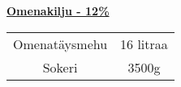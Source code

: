 \documentclass[20pt, a4]{article}
\begin{document}
{    \underline{\textbf{Omenakilju - 12\%}}


    \begin{tabular}{ cc } 
        Omenatäysmehu & 16 litraa\\
        Sokeri & 3500g\\
    \end{tabular}
    \\



}
\end{document}
